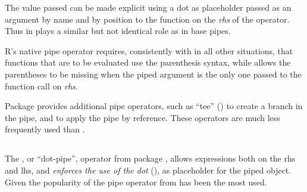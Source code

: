 \documentclass[krantz2]{krantz}\usepackage{knitr}
\begin{document}
The value passed can be made explicit using a dot as placeholder passed as an argument by name and by position to the function on the \emph{rhs} of the \Roperator{\%>\%} operator. Thus  in  plays a similar but not identical role as \code{\_} in base \Rlang pipes.

\begin{knitrout}\footnotesize
{}\color{fgcolor}
\end{knitrout}

R's native pipe operator requires, consistently with \Rlang in all other situations, that functions that are to be evaluated use the parenthesis syntax, while  allows the parentheses to be missing when the piped argument is the only one passed to the function call on \textit{rhs}.

\begin{knitrout}\footnotesize
{}\color{fgcolor}
\end{knitrout}

Package  provides additional pipe operators, such as ``tee'' () to create a branch in the pipe, and \Roperator{\%<>\%} to apply the pipe by reference. These operators are much less frequently used than \Roperator{\%>\%}.

\subsection{}
The , or ``dot-pipe'', operator from package , allows expressions both on the rhs and lhs, and \emph{enforces the use of the dot} (), as placeholder for the piped object. Given the popularity of  the pipe operator from  has been the most used.
\end{document}
